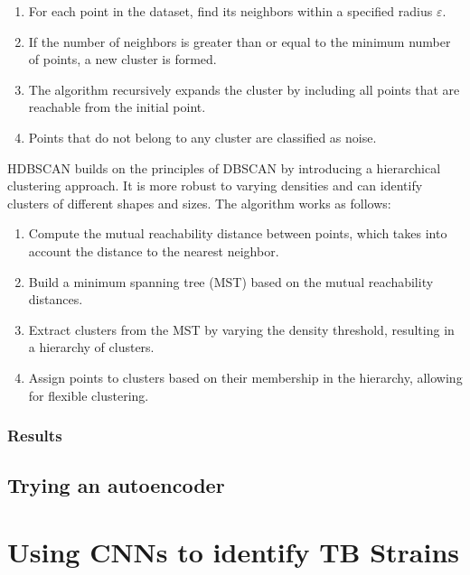 \begin{enumerate}
	\item For each point in the dataset, find its neighbors within a specified radius $\varepsilon$.
	\item If the number of neighbors is greater than or equal to the minimum number of points, a new cluster is formed.
	\item The algorithm recursively expands the cluster by including all points that are reachable from the initial point.
	\item Points that do not belong to any cluster are classified as noise.
\end{enumerate}

\label{subsubsec:hdbscan}

HDBSCAN builds on the principles of DBSCAN by introducing a hierarchical clustering approach. It is more robust to varying
densities and can identify clusters of different shapes and sizes. The algorithm works as follows:

\begin{enumerate}
	\item Compute the mutual reachability distance between points, which takes into account the distance to the nearest neighbor.
	\item Build a minimum spanning tree (MST) based on the mutual reachability distances.
	\item Extract clusters from the MST by varying the density threshold, resulting in a hierarchy of clusters.
	\item Assign points to clusters based on their membership in the hierarchy, allowing for flexible clustering.
\end{enumerate}

\subsection{Results}
\label{subsec:results_dbscan_hdbscan}

\section{Trying an autoencoder}
\label{sec:autoencoder}

\chapter{Using CNNs to identify TB Strains}
\label{chap:cnn_tb_strains}

